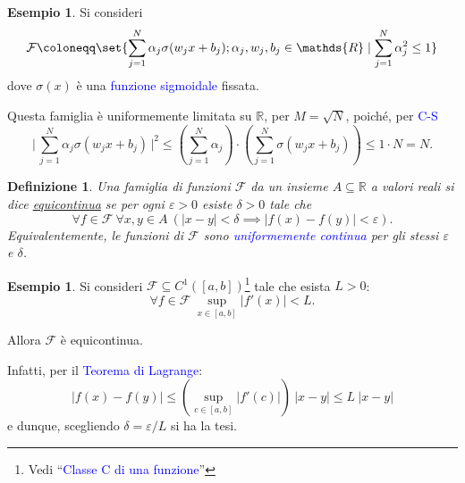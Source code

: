 \documentclass[10pt]{book}
\newcommand{\1}{\mathds{1}}
\newcommand{\R}{\mathds{R}}
\theoremstyle{definition}%
\newtheorem{esempio}[thm]{Esempio}
\theoremstyle{plain}
\newtheorem{definizione}[thm]{Definizione}
\theoremstyle{remark}
\renewcommand{\href}[2]{\textcolor{blue}{#2}}
\begin{document}
\begin{esempio}
Si consideri
\begin{equation*}
\mathcal{F}\coloneqq \set{\sum_{j=1}^{N} \alpha_{j}\sigma(w_{j}x+b_{j}); \alpha_{j}, w_{j}, b_{j} \in \R\mid \sum_{j=1}^{N}\alpha_{j}^{2} \le 1}
\end{equation*}
dove \(\sigma(x)\) è una \href{../../../../../org/roam/20250625110110-funzione_sigmoidale.org}{funzione sigmoidale} fissata.

Questa famiglia è uniformemente limitata su \(\R\), per \(M=\sqrt{N}\), poiché, per \href{../../../../../org/roam/20250629112810-disuguaglianza_di_cauchy_schwarz.org}{C-S}
\begin{equation*}
\bigg\lvert\,\sum_{j=1}^{N}\alpha_{j}\sigma(w_{j}x+b_{j})\,\bigg\rvert^{2}\le \left(\sum_{j=1}^{N}\alpha_{j}\right)\cdot\left(\sum_{j=1}^{N}\sigma(w_{j}x+b_{j})\right)\le 1\cdot N=N.
\end{equation*}
\end{esempio}
\begin{definizione}
Una famiglia di funzioni \(\mathcal{F}\) da un insieme \(A \subseteq \R\) a valori reali si dice \uline{equicontinua} se per ogni \(\varepsilon>0\) esiste \(\delta>0\) tale che
\begin{equation*}
\forall f \in \mathcal{F}\ \forall x,y \in A\ \left(|x-y|<\delta\implies |f(x)-f(y)|<\varepsilon\right).
\end{equation*}
Equivalentemente, le funzioni di \(\mathcal{F}\) sono \href{../../../../../org/roam/20250611135127-funzione_uniformemente_continua.org}{uniformemente continua} per gli stessi \(\varepsilon\) e \(\delta\).
\end{definizione}

\begin{esempio}
Si consideri \(\mathcal{F} \subseteq C^{1}\left([a,b]\right)\)\footnote{Vedi ``\href{../../../../../org/roam/20250113125602-classe_c_di_una_funzione.org}{Classe C di una funzione}''} tale che esista \(L>0\):
\begin{equation*}
\forall f \in \mathcal{F}\ \sup_{x \in [a,b]}|f'(x)|<L.
\end{equation*}

Allora \(\mathcal{F}\) è equicontinua.

Infatti, per il \href{../../../../../org/roam/20250629143200-teorema_di_lagrange.org}{Teorema di Lagrange}:
\begin{equation*}
|f(x)-f(y)|\le \left(\sup_{c \in [a,b]} |f'(c)|\right)\ |x-y| \le L\ |x-y|
\end{equation*}
e dunque, scegliendo \(\delta = \varepsilon/L\) si ha la tesi.
\end{esempio}
\end{document}
